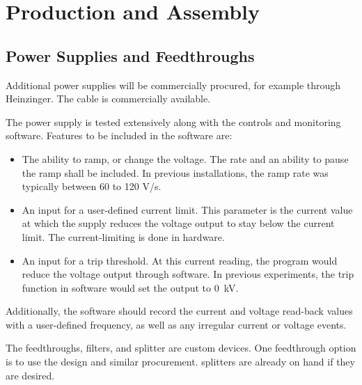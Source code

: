 \section{Production and Assembly}
\label{sec:fdsp-hv-prod-assy}

\subsection{Power Supplies and Feedthroughs}
\label{sec:fdsp-hv-supplies-feedthroughs}

Additional power supplies will be commercially procured, for example through Heinzinger. The  cable is commercially available.

The power supply is tested extensively along with the controls and monitoring software.  Features to be included in the software are:
\begin{itemize}
\item The ability to ramp, or change the voltage.  The rate and an ability to pause the ramp shall be included.  In previous installations, the ramp rate was typically between 60 to 120 V/s.
\item An input for a user-defined current limit.  This parameter is the current value at which the supply reduces the voltage output to stay below the current limit.  The current-limiting is done in hardware.
\item An input for a trip threshold.  At this current reading, the program would reduce the voltage output through software.  In previous experiments, the trip function in software would set the output to \SI{0}{kV}.
\end{itemize}
\noindent Additionally, the software should record the current and voltage read-back values with a user-defined frequency, as well as any irregular current or voltage events.

The  feedthroughs, filters, and splitter are custom devices.  One feedthrough option is to use the  design and similar procurement.   splitters are already on hand if they are desired.

\subsection{}
\label{sec:fdsp-hv-prod-cpa}


